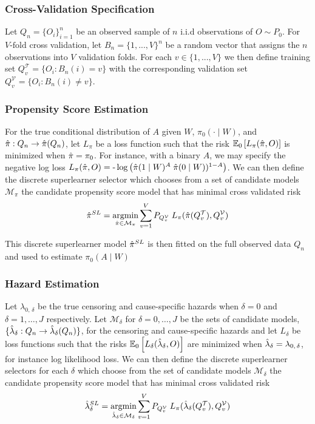 \documentclass{report}
\DeclareMathOperator*{\argmin}{argmin}
\newcommand{\1}{\ensuremath{\mathbf{1}}}
\newcommand{\X}{\ensuremath{{W}}}
\newcommand{\g}{\ensuremath{\pi}}
\begin{document}
\subsubsection{Cross-Validation Specification}
\label{sec:orgd123a56}
Let \(Q_n = \{O_i\}_{i=1}^n\) be an observed sample of \(n\) i.i.d observations of \(O \sim P_0\). For \(V\text{-fold}\) cross validation, let \(B_n = \{1, ... , V\}^n\) be a random vector that assigns the \(n\) observations into \(V\) validation folds. For each \(v \in \{1, ..., V\}\) we then define training set \(Q^\mathcal{T}_v = \{O_i : B_n(i) = v\}\) with the corresponding validation set \(Q^\mathcal{V}_v = \{O_i : B_n(i) \neq v\}\).

\subsubsection{Propensity Score Estimation}
\label{sec:orge74a6c2}
For the true conditional distribution of \(A\) given \(\X\), \(\g_0(\cdot \mid \X)\), and \(\Hat{\g} : Q_n \to \Hat{\g}(Q_n)\), let \(L_\g\) be a loss function such that the risk \(\mathbb{E}_0\left[L_\g(\Hat{\g}, O)\right]\) is minimized when \(\Hat{\g} = \g_0\). For instance, with a binary \(A\), we may specify the negative log loss \(L_\g(\Hat{\g}, O) = \text{-}\log\left(\Hat{\g}(1 \mid \X)^A \; \Hat{\g}(0 \mid \X))^{1-A}\right)\). We can then define the discrete superlearner selector which chooses from a set of candidate models \(\mathcal{M_\g}\) the candidate propensity score model that has minimal cross validated risk 
\[ \Hat{\g}^{SL} = \argmin_{\Hat{\g} \in \mathcal{M}_\g} \sum_{v = 1}^{V} P_{Q^\mathcal{V}_v} \; L_\g(\Hat{\g}(Q^\mathcal{T}_v), Q^\mathcal{V}_v)\]

This discrete superlearner model \(\Hat{\g}^{SL}\) is then fitted on the full observed data \(Q_n\) and used to estimate \(\g_0(A \mid \X)\)

\subsubsection{Hazard Estimation}
\label{sec:orgf2df3cf}
Let \(\lambda_{0,\,\delta}\) be the true censoring and cause-specific hazards when \(\delta = 0\) and \(\delta = 1, \dots, J\) respectively. Let \(\mathcal{M}_\delta\) for \(\delta = 0, \dots, J\) be the sets of candidate models, \(\{\Hat{\lambda}_\delta : Q_n \to \Hat{\lambda}_\delta(Q_n)\}\), for the censoring and cause-specific hazards and let \(L_\delta\) be loss functions such that the risks \(\mathbb{E}_0\left[L_\delta(\Hat{\lambda}_\delta, O)\right]\) are minimized when \(\Hat{\lambda}_\delta = \lambda_{0,\,\delta}\), for instance log likelihood loss. We can then define the discrete superlearner selectors for each \(\delta\) which choose from the set of candidate models \(\mathcal{M_\delta}\) the candidate propensity score model that has minimal cross validated risk 
\[ \Hat{\lambda}_\delta^{SL} = \argmin_{\Hat{\lambda}_\delta \in \mathcal{M}_\delta} \sum_{v = 1}^{V} P_{Q^\mathcal{V}_v} \; L_\g(\Hat{\lambda}_\delta(Q^\mathcal{T}_v), Q^\mathcal{V}_v)\]
\end{document}
